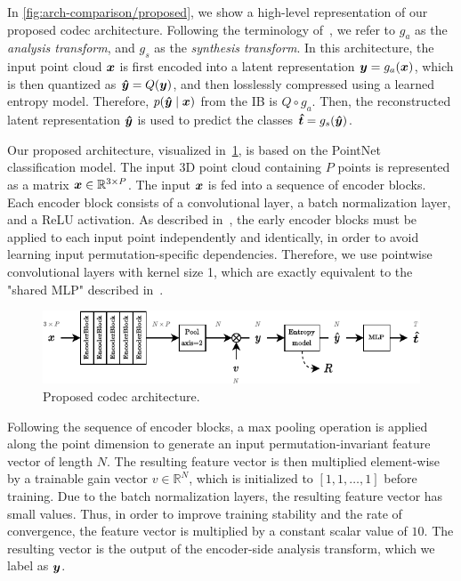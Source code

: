 In \cref{fig:arch-comparison/proposed}, we show a high-level representation of our proposed codec architecture.
Following the terminology of~\cite{balle2018variational}, we refer to $g_a$ as the \emph{analysis transform}, and $g_s$ as the \emph{synthesis transform}.
In this architecture, the input point cloud ${\boldsymbol{x}}$ is first encoded into a latent representation ${\boldsymbol{y}} = g_a({\boldsymbol{x}})$, which is then quantized as ${\boldsymbol{\hat{y}}} = Q({\boldsymbol{y}})$, and then losslessly compressed using a learned entropy model.
Therefore, $p({\boldsymbol{\hat{y}}} \mid {\boldsymbol{x}})$ from the IB is $Q \circ g_a$.
Then, the reconstructed latent representation ${\boldsymbol{\hat{y}}}$ is used to predict the classes ${\boldsymbol{\hat{t}}} = g_s({\boldsymbol{\hat{y}}})$.

Our proposed architecture, visualized in~\cref{fig:arch-proposed-full}, is based on the PointNet~\cite{qi2016pointnet} classification model.
The input 3D point cloud containing $P$ points is represented as a matrix ${\boldsymbol{x}} \in \mathbb{R}^{3 \times P}$.
The input ${\boldsymbol{x}}$ is fed into a sequence of encoder blocks.
Each encoder block consists of a convolutional layer, a batch normalization layer, and a ReLU activation.
As described in~\cite{qi2016pointnet}, the early encoder blocks must be applied to each input point independently and identically, in order to avoid learning input permutation-specific dependencies.
Therefore, we use pointwise convolutional layers with kernel size 1, which are exactly equivalent to the "shared MLP" described in~\cite{qi2016pointnet}.

\begin{figure}[tb]
  \centering
  \includegraphics[width=1.0\linewidth]{img/point_cloud_compression/arch/proposed-full.pdf}
  \caption{Proposed codec architecture.}
  \label{fig:arch-proposed-full}
\end{figure}

Following the sequence of encoder blocks, a max pooling operation is applied along the point dimension to generate an input permutation-invariant feature vector of length $N$.
The resulting feature vector is then multiplied element-wise by a trainable gain vector $v \in \mathbb{R}^{N}$, which is initialized to $[1, 1, \ldots, 1]$ before training.
Due to the batch normalization layers, the resulting feature vector has small values.
Thus, in order to improve training stability and the rate of convergence, the feature vector is multiplied by a constant scalar value of $10$.
The resulting vector is the output of the encoder-side analysis transform, which we label as ${\boldsymbol{y}}$.

